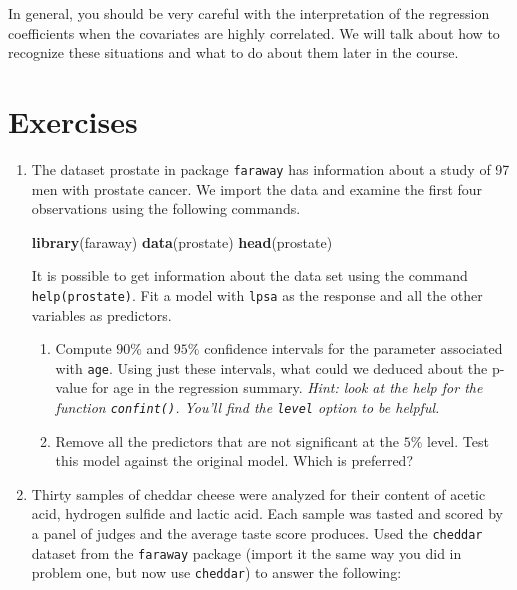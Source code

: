 \documentclass[]{book}
\newenvironment{Shaded}{\begin{snugshade}}{\end{snugshade}}
\newcommand{\KeywordTok}[1]{\textcolor[rgb]{0.13,0.29,0.53}{\textbf{{#1}}}}
\newcommand{\NormalTok}[1]{{#1}}
\theoremstyle{definition}
\theoremstyle{definition}
\theoremstyle{remark}
\begin{document}
In general, you should be very careful with the interpretation of the
regression coefficients when the covariates are highly correlated. We
will talk about how to recognize these situations and what to do about
them later in the course.

\section{Exercises}\label{exercises-2}

\begin{enumerate}
\def\labelenumi{\arabic{enumi}.}
\item
  The dataset prostate in package \texttt{faraway} has information about
  a study of 97 men with prostate cancer. We import the data and examine
  the first four observations using the following commands.

\begin{Shaded}
\begin{Highlighting}[]
\KeywordTok{library}\NormalTok{(faraway)}
\KeywordTok{data}\NormalTok{(prostate)}
\KeywordTok{head}\NormalTok{(prostate)}
\end{Highlighting}
\end{Shaded}

  It is possible to get information about the data set using the command
  \texttt{help(prostate)}. Fit a model with \texttt{lpsa} as the
  response and all the other variables as predictors.

  \begin{enumerate}
  \def\labelenumii{\alph{enumii})}
  \item
    Compute \(90\%\) and \(95\%\) confidence intervals for the parameter
    associated with \texttt{age}. Using just these intervals, what could
    we deduced about the p-value for age in the regression summary.
    \emph{Hint: look at the help for the function \texttt{confint()}.
    You'll find the \texttt{level} option to be helpful.}
  \item
    Remove all the predictors that are not significant at the \(5\%\)
    level. Test this model against the original model. Which is
    preferred?
  \end{enumerate}
\item
  Thirty samples of cheddar cheese were analyzed for their content of
  acetic acid, hydrogen sulfide and lactic acid. Each sample was tasted
  and scored by a panel of judges and the average taste score produces.
  Used the \texttt{cheddar} dataset from the \texttt{faraway} package
  (import it the same way you did in problem one, but now use
  \texttt{cheddar}) to answer the following:


\end{enumerate}
\end{document}
